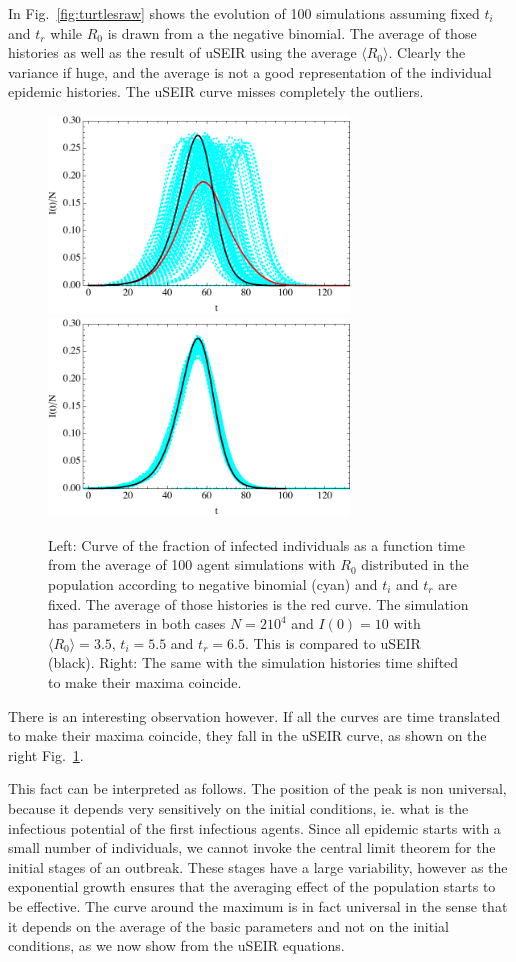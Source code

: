 \documentclass[a4paper,oneside,11pt]{article}
\begin{document}
  In Fig.~\ref{fig:turtlesraw} shows the evolution of 100 simulations assuming fixed $t_i$ and $t_r$ while $R_0$ is drawn from a the negative binomial. The average of those histories as well as the result of 
  uSEIR using the average $\langle R_0\rangle$. Clearly the variance if huge, and the average is not a good representation of the individual epidemic histories. The uSEIR curve misses completely the outliers. 
  
 \begin{figure}[h!]
  \centering
\includegraphics[width=8cm]{turtlesraw.pdf}\includegraphics[width=8cm]{turtlesshift.pdf}
  \caption{ Left: Curve of the fraction of infected individuals as a function time from the average of 100 agent simulations with $R_0$ distributed in the population according to negative binomial (cyan) and $t_i$ and $t_r$ are fixed. The average of those histories is the red curve. The simulation has parameters in both cases $N= 2 10^4$ and $I(0)=10$ with $\langle R_0\rangle=3.5$, $t_i=5.5$ and $t_r=6.5$. This is compared to uSEIR (black). Right: The same with the simulation histories time shifted to make their maxima coincide.}
  \label{fig:turtles}
   \end{figure}
   
  There is an interesting observation however. If all the curves are time translated  to make their maxima coincide, they fall in the uSEIR curve, as shown on the right Fig.~\ref{fig:turtles}.
  
  This fact can be interpreted as follows. The position of the peak is non universal, because it depends very sensitively on the initial conditions, ie. what is the infectious potential of the first infectious agents. Since all epidemic starts with a small number of individuals, we cannot invoke the central limit theorem for the initial stages of an outbreak. These stages have a large variability, however as the exponential growth ensures that the averaging effect of the population starts to be effective. The curve around the maximum is in fact universal in the sense that it depends on the average of the basic parameters and not on the initial conditions, as we now show from the uSEIR equations.
  
\end{document}
